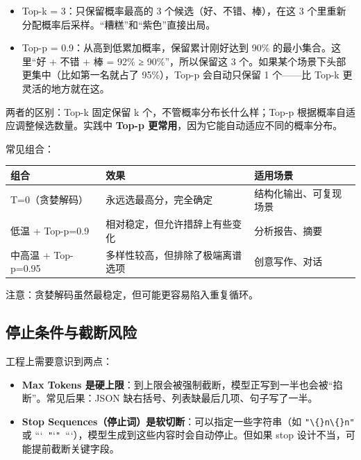 \documentclass[9pt,a4paper,twocolumn]{ctexart}
\begin{document}
\begin{itemize}[itemsep=1pt, topsep=2pt]
  \item Top-k = 3：只保留概率最高的 3 个候选（好、不错、棒），在这 3 个里重新分配概率后采样。“糟糕”和“紫色”直接出局。
  \item Top-p = 0.9：从高到低累加概率，保留累计刚好达到 90\% 的最小集合。这里“好 + 不错 + 棒 = 92\% ≥ 90\%”，所以保留这 3 个。如果某个场景下头部更集中（比如第一名就占了 95\%），Top-p 会自动只保留 1 个——比 Top-k 更灵活的地方就在这。
\end{itemize}


两者的区别：Top-k 固定保留 k 个，不管概率分布长什么样；Top-p 根据概率自适应调整候选数量。实践中 \textbf{Top-p 更常用}，因为它能自动适应不同的概率分布。



常见组合：


{\footnotesize
\begin{tabular}{|p{}|p{}|p{}|}
\hline
\textbf{组合} & \textbf{效果} & \textbf{适用场景} \\
\hline
T=0（贪婪解码） & 永远选最高分，完全确定 & 结构化输出、可复现场景 \\
\hline
低温 + Top-p=0.9 & 相对稳定，但允许措辞上有些变化 & 分析报告、摘要 \\
\hline
中高温 + Top-p=0.95 & 多样性较高，但排除了极端离谱选项 & 创意写作、对话 \\
\hline
\end{tabular}
}



注意：贪婪解码虽然最稳定，但可能更容易陷入重复循环。



\subsection*{停止条件与截断风险}


工程上需要意识到两点：


\begin{itemize}[itemsep=1pt, topsep=2pt]
  \item \textbf{Max Tokens 是硬上限}：到上限会被强制截断，模型正写到一半也会被“掐断”。常见后果：JSON 缺右括号、列表缺最后几项、句子写了一半。
  \item \textbf{Stop Sequences（停止词）是软切断}：可以指定一些字符串（如 \texttt{"\textbackslash\{\}n\textbackslash\{\}n"} 或 ```\texttt{ "}`\texttt{" }```），模型生成到这些内容时会自动停止。但如果 stop 设计不当，可能提前截断关键字段。
\end{itemize}
\end{document}
